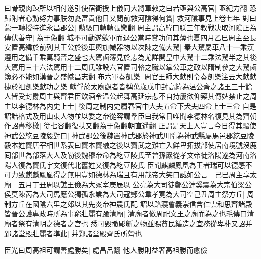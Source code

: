 曰骨親肉疎所以相付遂引使宿衛授上儀同大將軍敕之曰若亟與公高官|{
	亟紀力翻}
恐歸附者心動努力事朕勿憂富貴他日又問前救河隂得何賞|{
	救河隂事見上卷七年}
對曰蒙一轉授特進永昌郡公|{
	勲級曰轉轉張戀翻}
周主謂高緯曰朕三年教戰决取河隂正為傳伏善守|{
	為于偽翻}
城不可動遂歛軍而退公當時賞功何其薄也夏四月乙巳周主至長安置高緯於前列其王公於後車輿旗幟器物以次陳之備大駕|{
	秦大駕屬車八十一乘漢遵用之備千乘萬騎晉之盛也大駕鹵簿見於志為尤詳開皇中大駕十二乘法駕半之其後大駕用三十六法駕用十二周氏雖設六官置司輅之職以掌公車之政以隋制參之大駕鹵簿必不能如漢晉之盛幟昌志翻}
布六軍奏凱樂|{
	周官王師大獻則令奏凱樂注云大獻獻捷於祖凱樂獻功之樂}
獻俘於太廟觀者皆稱萬歲戊申封高緯為温公齊之諸王三十餘人皆受封爵周主與齊君臣飲酒令温公起舞高延宗悲不自持屢欲仰藥其傳婢禁止之周主以李德林為内史上士|{
	後周之制内史屬春官中大夫五命下犬夫四命上士三命}
自是詔誥格式及用山東人物並以委之帝從容謂羣臣曰我常日唯聞李德林名復見其為齊朝作詔書移檄|{
	從七容翻復扶又翻為于偽翻朝直遥翻}
正謂是天上人豈言今日得其驅使神武公紇豆陵毅對曰|{
	神武郡公後魏置神武郡於神武川隋為神武縣屬馬邑郡紇豆陵毅本姓竇唐宰相世系表曰竇本竇融之後以竇武之難亡入鮮卑拓拔部使居南境號沒鹿囘部世為部落大人及勒後魏穆帝命為紇豆陵氏至曾孫巖從孝文帝徙洛陽遂為河南洛陽人復為竇氏宇文復代北舊姓又復為紇豆陵氏}
臣聞麒麟鳳凰為王者瑞可以德感不可力致麒麟鳳凰得之無用豈如德林為瑞且有用哉帝大笑曰誠如公言　己巳周主享太廟　五月丁丑周以譙王儉為大冢宰庚辰以公亮為大司徒鄭公逹奚震為大宗伯梁公侯莫陳芮為大司馬應公獨孤永業為大司寇鄭公韋孝寛為大司空己丑周主祭方丘|{
	周制方丘在國隂六里之郊以其先炎帝神農氏配}
詔以路寢會義崇信含仁雲和思齊諸殿皆晉公護專政時所為事窮壯麗有踰清廟|{
	清廟者倣周祀文王之廟而為之也毛傳曰清廟者祭有清明之德者之宫也}
悉可毁撤彫斵之物並賜貧民繕造之宜務從卑朴又詔并鄴諸堂殿壯麗者凖此|{
	并鄴諸堂殿齊氏所營也}


臣光曰周高祖可謂善處勝矣|{
	處昌呂翻}
他人勝則益奢高祖勝而愈儉

